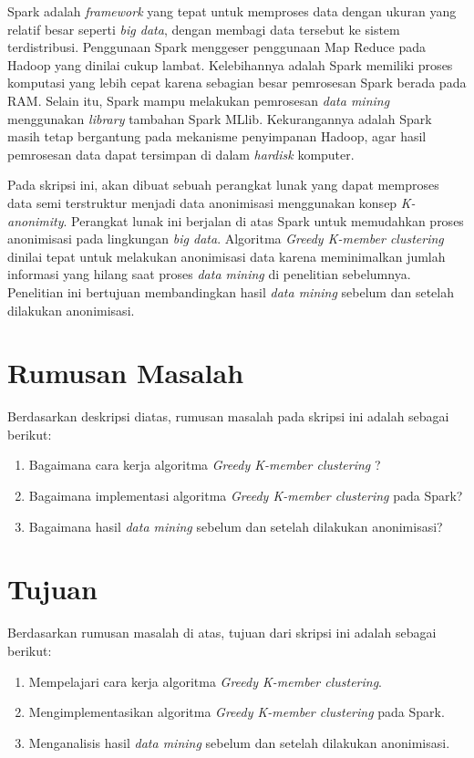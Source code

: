 Spark adalah {\it framework} yang tepat untuk memproses data dengan ukuran yang relatif besar seperti {\it big data}, dengan membagi data tersebut ke sistem terdistribusi. Penggunaan Spark menggeser penggunaan Map Reduce pada Hadoop yang dinilai cukup lambat. Kelebihannya adalah Spark memiliki proses komputasi yang lebih cepat karena sebagian besar pemrosesan Spark berada pada RAM. Selain itu, Spark mampu melakukan pemrosesan {\it data mining} menggunakan {\it library} tambahan Spark MLlib. Kekurangannya adalah Spark masih tetap bergantung pada mekanisme penyimpanan Hadoop, agar hasil pemrosesan data dapat tersimpan di dalam {\it hardisk} komputer.

Pada skripsi ini, akan dibuat sebuah perangkat lunak yang dapat memproses data semi terstruktur menjadi data anonimisasi menggunakan konsep {\it K-anonimity}. Perangkat lunak ini berjalan di atas Spark untuk memudahkan proses anonimisasi pada lingkungan {\it big data}. Algoritma {\it Greedy K-member clustering} dinilai tepat untuk melakukan anonimisasi data karena meminimalkan jumlah informasi yang hilang saat proses {\it data mining} di penelitian sebelumnya. Penelitian ini bertujuan membandingkan hasil {\it data mining} sebelum dan setelah dilakukan anonimisasi.

\section{Rumusan Masalah}
\label{sec:rumusan}
Berdasarkan deskripsi diatas, rumusan masalah pada skripsi ini adalah sebagai berikut:
\begin{enumerate}
\item Bagaimana cara kerja algoritma {\it Greedy K-member clustering} ?
\item Bagaimana implementasi algoritma {\it Greedy K-member clustering} pada Spark?
\item Bagaimana hasil {\it data mining} sebelum dan setelah dilakukan anonimisasi?
\end{enumerate}

\section{Tujuan}
\label{sec:tujuan}
Berdasarkan rumusan masalah di atas, tujuan dari skripsi ini adalah sebagai berikut:
\begin{enumerate}
\item Mempelajari cara kerja algoritma {\it Greedy K-member clustering}.
\item Mengimplementasikan algoritma {\it Greedy K-member clustering } pada Spark.
\item Menganalisis hasil {\it data mining} sebelum dan setelah dilakukan anonimisasi.
\end{enumerate}


